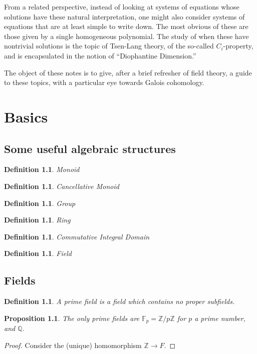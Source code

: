 \documentclass[12pt]{report}
\theoremstyle{plain}
\newtheorem{defn}[thm]{Definition}
\newtheorem{prop}[thm]{Proposition}
\begin{document}
From a related perspective, instead of looking at systems of equations
whose solutions have these natural interpretation, one might also consider
systems of equations that are at least simple to write down. The most
obvious of these are those given by a single homogeneous polynomial. The
study of when these have nontrivial solutions is the topic of Tsen-Lang
theory, of the so-called $C_i$-property, and is encapsulated in the notion
of ``Diophantine Dimension.''

\bigskip

The object of these notes is to give, after a brief refresher of field
theory, a guide to these topics, with a particular eye towards Galois
cohomology.

\chapter{Basics}

\section{Some useful algebraic structures}

\begin{defn}
Monoid
\end{defn}

\begin{defn}
Cancellative Monoid
\end{defn}

\begin{defn}
Group
\end{defn}

\begin{defn}
Ring
\end{defn}

\begin{defn}
Commutative Integral Domain
\end{defn}

\begin{defn}
Field
\end{defn}

\section{Fields}

\begin{defn}
A prime field is a field which contains no proper subfields.
\end{defn}

\begin{prop}
The only prime fields are $\mathbb F_p = \mathbb Z/p \mathbb Z$ for $p$ a
prime number, and $\mathbb Q$.
\end{prop}
\begin{proof}
Consider the (unique) homomorphism $\mathbb Z \to F$.
\end{proof}
\end{document}

